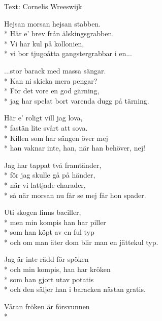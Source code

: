 \begin{SongText}
\begin{SongInfo}
    Text: Cornelis Wreeswijk
\end{SongInfo}
\begin{SongVerse}
Hejsan morsan hejsan stabben.\\*%
Här e’ brev från älskingsgrabben.\\*%
Vi har kul på kollonien,\\*%
vi bor tjugoåtta gangstergrabbar i en...
\end{SongVerse}
\begin{SongVerse}
...stor barack med massa sängar.\\*%
Kan ni skicka mera pengar?\\*%
För det vore en god gärning,\\*%
jag har spelat bort varenda dugg på tärning.
\end{SongVerse}
\begin{SongVerse}
Här e’ roligt vill jag lova,\\*%
fastän lite svårt att sova.\\*%
Killen som har sängen över mej\\*%
han vaknar inte, han, när han behöver, nej!
\end{SongVerse}
\begin{SongVerse}
Jag har tappat två framtänder,\\*%
för jag skulle gå på händer,\\*%
när vi lattjade charader,\\*%
så när morsan nu får se mej får hon spader.
\end{SongVerse}
\begin{SongVerse}
Uti skogen finns baciller,\\*%
men min kompis han har piller\\*%
som han köpt av en ful typ\\*%
och om man äter dom blir man en jättekul typ.
\end{SongVerse}
\begin{SongVerse}
Jag är inte rädd för spöken\\*%
och min kompis, han har kröken\\*%
som han gjort utav potatis\\*%
och den säljer han i baracken nästan gratis.
\end{SongVerse}
\begin{SongVerse}
Våran fröken är försvunnen\\*%

\end{SongVerse}
\end{SongText}

